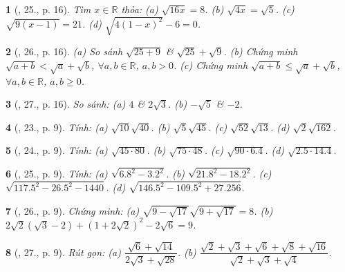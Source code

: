 \documentclass{article}
\newtheorem{baitoan}{}
\begin{document}
\begin{baitoan}[\cite{SGK_Toan_9_tap_1}, 25., p. 16]
	Tìm $x\in\mathbb{R}$ thỏa: (a) $\sqrt{16x} = 8$. (b) $\sqrt{4x} = \sqrt{5}$. (c) $\sqrt{9(x - 1)} = 21$. (d) $\sqrt{4(1 - x)^2} - 6 = 0$.
\end{baitoan}

\begin{baitoan}[\cite{SGK_Toan_9_tap_1}, 26., p. 16]
	(a) So sánh $\sqrt{25 + 9}$ \& $\sqrt{25} + \sqrt{9}$. (b) Chứng minh $\sqrt{a + b} < \sqrt{a} + \sqrt{b}$, $\forall a,b\in\mathbb{R}$, $a,b > 0$. (c) Chứng minh $\sqrt{a + b}\le\sqrt{a} + \sqrt{b}$, $\forall a,b\in\mathbb{R}$, $a,b\ge0$.
\end{baitoan}

\begin{baitoan}[\cite{SGK_Toan_9_tap_1}, 27., p. 16]
	So sánh: (a) $4$ \& $2\sqrt{3}$. (b) $-\sqrt{5}$ \& $-2$.
\end{baitoan}

\begin{baitoan}[\cite{SBT_Toan_9_tap_1}, 23., p. 9]
	Tính: (a) $\sqrt{10}\sqrt{40}$. (b) $\sqrt{5}\sqrt{45}$. (c) $\sqrt{52}\sqrt{13}$. (d) $\sqrt{2}\sqrt{162}$.
\end{baitoan}

\begin{baitoan}[\cite{SBT_Toan_9_tap_1}, 24., p. 9]
	Tính: (a) $\sqrt{45\cdot80}$. (b) $\sqrt{75\cdot48}$. (c) $\sqrt{90\cdot6.4}$. (d) $\sqrt{2.5\cdot14.4}$.
\end{baitoan}

\begin{baitoan}[\cite{SBT_Toan_9_tap_1}, 25., p. 9]
	Tính: (a) $\sqrt{6.8^2 - 3.2^2}$. (b) $\sqrt{21.8^2 - 18.2^2}$. (c) $\sqrt{117.5^2 - 26.5^2 - 1440}$.  (d) $\sqrt{146.5^2 - 109.5^2 + 27.256}$.
\end{baitoan}

\begin{baitoan}[\cite{SBT_Toan_9_tap_1}, 26., p. 9]
	Chứng minh: (a) $\sqrt{9 - \sqrt{17}}\sqrt{9 + \sqrt{17}} = 8$. (b) $2\sqrt{2}(\sqrt{3} - 2) + (1 + 2\sqrt{2})^2 - 2\sqrt{6} = 9$.
\end{baitoan}

\begin{baitoan}[\cite{SBT_Toan_9_tap_1}, 27., p. 9]
	Rút gọn: (a) $\dfrac{\sqrt{6} + \sqrt{14}}{2\sqrt{3} + \sqrt{28}}$. (b) $\dfrac{\sqrt{2} + \sqrt{3} + \sqrt{6} + \sqrt{8} + \sqrt{16}}{\sqrt{2} + \sqrt{3} + \sqrt{4}}$.
\end{baitoan}
\end{document}
